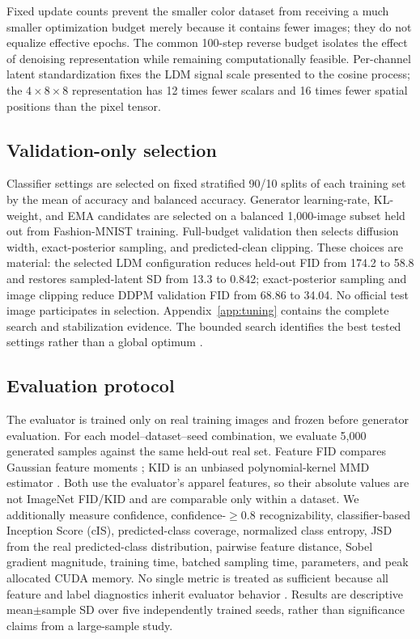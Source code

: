 \documentclass{article}
\begin{document}
Fixed update counts prevent the smaller color dataset from receiving a much smaller optimization budget merely because it contains fewer images; they do not equalize effective epochs. The common 100-step reverse budget isolates the effect of denoising representation while remaining computationally feasible. Per-channel latent standardization fixes the LDM signal scale presented to the cosine process; the $4\times8\times8$ representation has 12 times fewer scalars and 16 times fewer spatial positions than the pixel tensor.

\subsection{Validation-only selection}
Classifier settings are selected on fixed stratified 90/10 splits of each training set by the mean of accuracy and balanced accuracy. Generator learning-rate, KL-weight, and EMA candidates are selected on a balanced 1,000-image subset held out from Fashion-MNIST training. Full-budget validation then selects diffusion width, exact-posterior sampling, and predicted-clean clipping. These choices are material: the selected LDM configuration reduces held-out FID from 174.2 to 58.8 and restores sampled-latent SD from 13.3 to 0.842; exact-posterior sampling and image clipping reduce DDPM validation FID from 68.86 to 34.04. No official test image participates in selection. Appendix~\ref{app:tuning} contains the complete search and stabilization evidence. The bounded search identifies the best tested settings rather than a global optimum \citep{bergstra2012random}.

\subsection{Evaluation protocol}
The evaluator is trained only on real training images and frozen before generator evaluation. For each model--dataset--seed combination, we evaluate 5,000 generated samples against the same held-out real set. Feature FID compares Gaussian feature moments \citep{heusel2017fid}; KID is an unbiased polynomial-kernel MMD estimator \citep{binkowski2018kid}. Both use the evaluator's apparel features, so their absolute values are not ImageNet FID/KID and are comparable only within a dataset. We additionally measure confidence, confidence-$\geq0.8$ recognizability, classifier-based Inception Score (cIS), predicted-class coverage, normalized class entropy, JSD from the real predicted-class distribution, pairwise feature distance, Sobel gradient magnitude, training time, batched sampling time, parameters, and peak allocated CUDA memory. No single metric is treated as sufficient because all feature and label diagnostics inherit evaluator behavior \citep{stein2023flaws}. Results are descriptive mean$\pm$sample SD over five independently trained seeds, rather than significance claims from a large-sample study.
\end{document}
